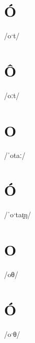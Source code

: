 \documentclass[10pt,a4paper,twoside]{book}
\begin{document}
\section*{Ó}

\begin{multicols}{3}
 {/oˑt/} {}
\end{multicols}

\section*{Ô}

\begin{multicols}{3}
 {/oːt/} {}
\end{multicols}

\section*{O}

\begin{multicols}{3}
 {/ˈotaː/} {}
\end{multicols}

\section*{Ó}

\begin{multicols}{3}
 {/ˈoˑtaɪ̯ŋ/} {}
\end{multicols}

\section*{O}

\begin{multicols}{3}
 {/oθ/} {}
\end{multicols}

\section*{Ó}

\begin{multicols}{3}
 {/oˑθ/} {}
\end{multicols}
\end{document}
